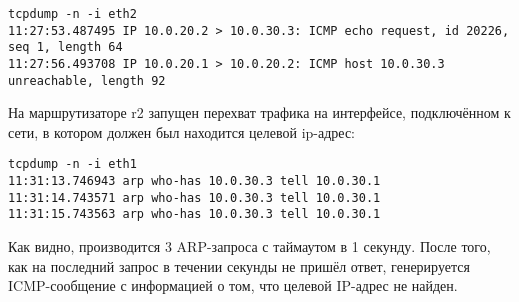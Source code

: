 \documentclass[a4paper,12pt]{article}
\begin{document}
\begin{Verbatim}
tcpdump -n -i eth2
11:27:53.487495 IP 10.0.20.2 > 10.0.30.3: ICMP echo request, id 20226, seq 1, length 64
11:27:56.493708 IP 10.0.20.1 > 10.0.20.2: ICMP host 10.0.30.3 unreachable, length 92
\end{Verbatim}

 На маршрутизаторе r2 запущен перехват трафика на интерфейсе, подключённом к сети, в котором должен был находится целевой ip-адрес:

\begin{Verbatim}
tcpdump -n -i eth1
11:31:13.746943 arp who-has 10.0.30.3 tell 10.0.30.1
11:31:14.743571 arp who-has 10.0.30.3 tell 10.0.30.1
11:31:15.743563 arp who-has 10.0.30.3 tell 10.0.30.1
\end{Verbatim}

Как видно, производится 3 ARP-запроса с таймаутом в 1 секунду. После того, как на последний запрос в течении секунды не пришёл ответ, 
генерируется ICMP-сообщение с информацией о том, что целевой IP-адрес не найден.
\end{document}
